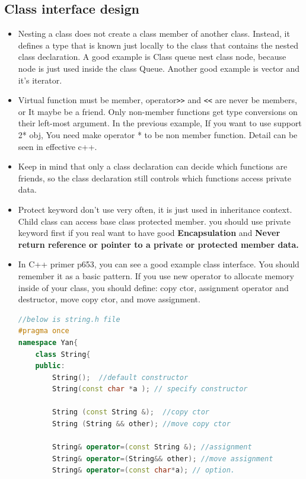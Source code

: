 \documentclass[a4paper,11pt,twoside]{book}
\begin{document}
\subsection{Class interface design}
\begin{itemize}
	
	\item Nesting a class does not create a class member of another class. Instead, it defines a type that is known just locally to the class that contains the nested class declaration.  A good example is Class queue nest class node,  because node is just used inside the class Queue. Another good example is vector and it's iterator.
	
	\item Virtual function must be member, operator\verb=>>= and \verb=<<= are never be members, or It maybe be a friend. Only non-member functions get type conversions on their left-most argument.  In the previous example, If you want to use support 2* obj, You need make operator * to be non member function.  Detail can be seen in effective c++.
	
	\item Keep in mind that only a class declaration can decide which functions are friends, so the class declaration still controls which functions access private data.
	
	\item Protect keyword don't use very often, it is just used in inheritance context. Child class can access base class protected member. you should use private keyword first if you real want to have good \textbf{Encapsulation} and \textbf{Never return reference or pointer to a private or protected member data.}
	
	\item In C++ primer p653, you can see a good example class interface. You should remember it as a basic pattern.  If you use new operator to allocate memory inside of your class, you should define: copy ctor, assignment operator and destructor, move copy ctor, and move assignment.
	
\begin{lstlisting}[frame=single, language=c++]
//below is string.h file
#pragma once
namespace Yan{
	class String{
	public:
		String();  //default constructor
		String(const char *a ); // specify constructor
		
		String (const String &);  //copy ctor
		String (String && other); //move copy ctor
		
		String& operator=(const String &); //assignment
		String& operator=(String&& other); //move assignment
		String& operator=(const char*a); // option.
		

\end{lstlisting}
\end{itemize}
\end{document}
